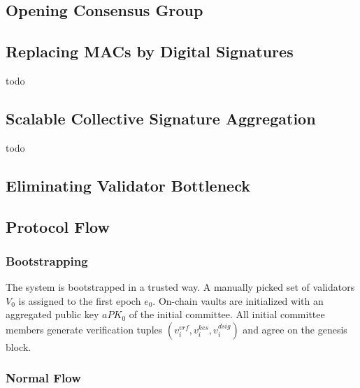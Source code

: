 \subsection{Opening Consensus Group}\label{subsec:opening-consensus-group-and-leaders}


\subsection{Replacing MACs by Digital Signatures}\label{subsec:replacing-macs-by-digital-signatures}

todo

\subsection{Scalable Collective Signature Aggregation}\label{subsec:scalable-collective-signature-aggregation}

todo

\subsection{Eliminating Validator Bottleneck}\label{subsec:eliminating-validator-bottleneck}


\subsection{Protocol Flow}\label{subsec:protocol-flow}

\subsubsection{Bootstrapping}\label{subsubsec:bootstrapping}

The system is bootstrapped in a trusted way.
A manually picked set of validators $V_0$ is assigned to the first epoch $e_0$.
On-chain vaults are initialized with an aggregated public key $aPK_0$ of the initial committee.
All initial committee members generate verification tuples ${(v_i^{vrf}, v_i^{kes}, v_i^{dsig})}$
and agree on the genesis block.

\subsubsection{Normal Flow}\label{subsubsec:normal-flow}

